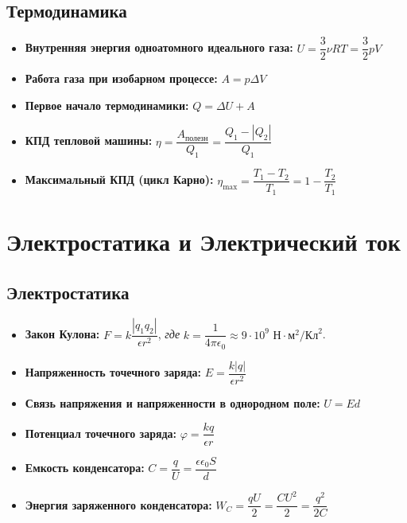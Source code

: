 \documentclass[11pt, a4paper]{article}
\begin{document}
\subsection{Термодинамика}
\begin{itemize}
    \item \textbf{Внутренняя энергия одноатомного идеального газа:} $U = \dfrac{3}{2} \nu R T = \dfrac{3}{2} p V$
    \item \textbf{Работа газа при изобарном процессе:} $A = p \Delta V$
    \item \textbf{Первое начало термодинамики:} $Q = \Delta U + A$
    \item \textbf{КПД тепловой машины:} $\eta = \dfrac{A_{\text{полезн}}}{Q_1} = \dfrac{Q_1 - |Q_2|}{Q_1}$
    \item \textbf{Максимальный КПД (цикл Карно):} $\eta_{\max} = \dfrac{T_1 - T_2}{T_1} = 1 - \dfrac{T_2}{T_1}$
\end{itemize}

\section{Электростатика и Электрический ток}

\subsection{Электростатика}
\begin{itemize}
    \item \textbf{Закон Кулона:} $F = k \dfrac{|q_1 q_2|}{\epsilon r^2}$, \quad \textit{где} $k = \dfrac{1}{4\pi\epsilon_0} \approx 9 \cdot 10^9 \text{ Н}\cdot\text{м}^2/\text{Кл}^2$.
    \item \textbf{Напряженность точечного заряда:} $E = \dfrac{k |q|}{\epsilon r^2}$
    \item \textbf{Связь напряжения и напряженности в однородном поле:} $U = E d$
    \item \textbf{Потенциал точечного заряда:} $\varphi = \dfrac{k q}{\epsilon r}$
    \item \textbf{Емкость конденсатора:} $C = \dfrac{q}{U} = \dfrac{\epsilon \epsilon_0 S}{d}$
    \item \textbf{Энергия заряженного конденсатора:} $W_C = \dfrac{q U}{2} = \dfrac{C U^2}{2} = \dfrac{q^2}{2C}$
\end{itemize}
\end{document}
